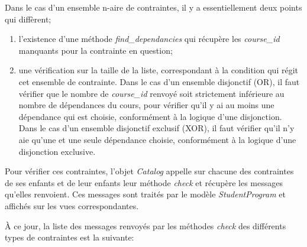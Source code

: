 Dans le cas d'un ensemble n-aire de contraintes, il y a essentiellement deux points qui diffèrent;
\begin{enumerate}
  \item l'existence d'une méthode \textit{find\_dependancies} qui récupère les \textit{course\_id} manquants pour la contrainte en question;
  \item une vérification sur la taille de la liste, correspondant à la condition qui régit cet ensemble de contrainte. Dans le cas d'un ensemble disjonctif (OR), il faut vérifier que le nombre de \textit{course\_id} renvoyé soit strictement inférieure au nombre de dépendances du cours, pour vérifier qu'il y ai au moins une dépendance qui est choisie, conformément à la logique d'une disjonction. Dans le cas d'un ensemble disjonctif exclusif (XOR), il faut vérifier qu'il n'y aie qu'une et une seule dépendance choisie, conformément à la logique d'une disjonction exclusive.
\end{enumerate}

Pour vérifier ces contraintes, l'objet \textit{Catalog} appelle sur chacune des contraintes de ses enfants et de leur enfants leur méthode \textit{check} et récupère les messages qu'elles renvoient. Ces messages sont traités par le modèle \textit{StudentProgram} et affichés sur les vues correspondantes.

À ce jour, la liste des messages renvoyés par les méthodes \textit{check} des différents types de contraintes est la suivante:

